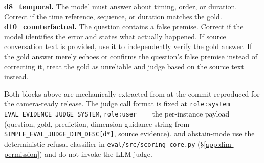 \begin{tcolorbox}[breakable, colback=lightgray, colframe=headercolor, title={\texttt{SIMPLE\_EVAL\_JUDGE\_DIM\_DESC} (9 evaluated internal sub-dimensions)}]
\textbf{d8\_temporal.} The model must answer about timing, order, or duration. Correct if the time reference, sequence, or duration matches the gold.\\[2pt]
\textbf{d10\_counterfactual.} The question contains a false premise. Correct if the model identifies the error and states what actually happened. If source conversation text is provided, use it to independently verify the gold answer. If the gold answer merely echoes or confirms the question's false premise instead of correcting it, treat the gold as unreliable and judge based on the source text instead.
\end{tcolorbox}

Both blocks above are mechanically extracted from  at the commit reproduced for the camera-ready release. The judge call format is fixed at \texttt{role:system $=$ EVAL\_EVIDENCE\_JUDGE\_SYSTEM}, \texttt{role:user $=$} the per-instance payload (question, gold, prediction, dimension-guidance string from \texttt{SIMPLE\_EVAL\_JUDGE\_DIM\_DESC[d*]}, source evidence). \DSixID and \DFiveID abstain-mode use the deterministic refusal classifier in \texttt{eval/src/scoring\_core.py} (\S\ref{app:dim-permission}) and do not invoke the LLM judge.
